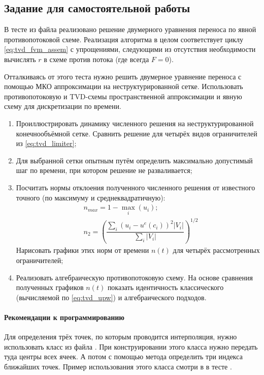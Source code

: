 \subsection{Задание для самостоятельной работы}
В тесте 
из файла 
реализовано решение
двумерного уравнения переноса 
по явной противопотоковой схеме.
Реализация алгоритма
в целом соответствует циклу \cref{eq:tvd_fvm_assem}
с упрощениями, следующими из отсутствия
необходимости вычислять $r$ в схеме против потока (где всегда $F=0$).

Отталкиваясь от этого теста нужно решить двумерное уравнение переноса
с помощью МКО аппроксимации на неструктурированной
сетке. 
Использовать противопотоковую и TVD-схемы
пространственной аппроксимации
и явную схему для дискретизации по времени.

\begin{enumerate}
\item
Проиллюстрировать динамику численного решения на неструктурированной конечнообъёмной сетке.
Сравнить решение для четырёх видов ограничителей из \cref{eq:tvd_limiter};
\item
Для выбранной сетки опытным путём определить максимально допустимый шаг по времени, при котором решение не разваливается;
\item 
Посчитать нормы отклоения полученного численного решения от известного точного (по максимуму и среднеквадратичную):
\begin{align*}
&n_{max} = 1 - \max\limits_{i} (u_i); \\
&n_2 = \left(\dfrac{\sum_i { \left(u_i - u^e(c_i)\right)^2 \left| V_i \right| }}{\sum_i \left| V_i \right|}\right)^{1/2}
\end{align*}
Нарисовать графики этих норм от времени $n(t)$ для четырёх рассмотренных ограничителей;
\item
Реализовать алгебраическую противопотоковую схему.
На основе сравнения полученных графиков $n(t)$ показать идентичность
классического (вычисляемой по \cref{eq:tvd_upw}) и алгебраического подходов.
\end{enumerate}

\paragraph{Рекомендации к программированию}
Для определения трёх точек, по которым проводится интерполяция, нужно
использовать класс  из файла .
При конструировании этого класса нужно передать туда центры всех ячеек.
А потом с помощью метода  определить три индекса ближайших точек.
Пример использования этого класса смотри в 
в тесте .
